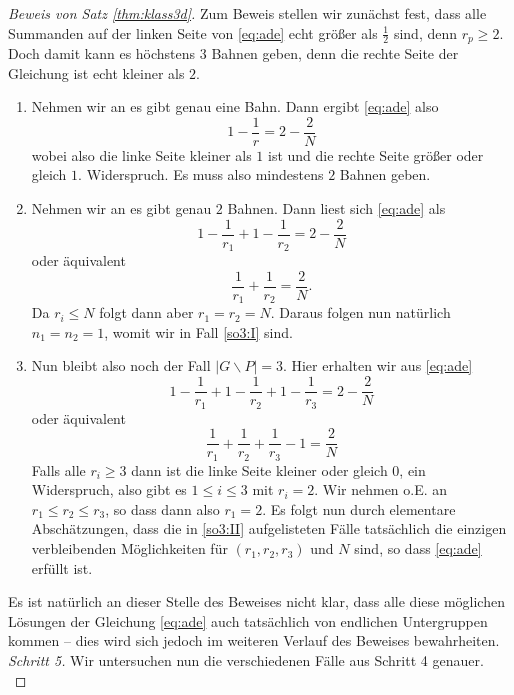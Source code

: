 \documentclass{book}
\begin{document}
\begin{proof}[Beweis von Satz \ref{thm:klass3d}]
    Zum Beweis stellen wir zunächst fest, dass alle Summanden auf der linken
    Seite von \eqref{eq:ade} echt größer als $\frac{1}{2}$ sind, denn $r_p \ge
    2$. Doch damit kann es höchstens $3$ Bahnen geben, denn die rechte Seite
    der Gleichung ist echt kleiner als $2$. 

    \begin{enumerate}
        \item Nehmen wir an es gibt genau eine Bahn. Dann ergibt \eqref{eq:ade} also
            \[
                1 - \frac{1}{r} = 2 - \frac{2}{N}  
            \]
            wobei also die linke Seite kleiner als $1$ ist und die rechte Seite größer oder gleich $1$. Widerspruch. Es muss also mindestens $2$ Bahnen geben.
        \item Nehmen wir an es gibt genau $2$ Bahnen. Dann liest sich \eqref{eq:ade} als
            \[
                1 - \frac{1}{r_1} +  1 - \frac{1}{r_2} = 2 - \frac{2}{N}  
            \]
            oder äquivalent
            \[
                \frac{1}{r_1} +\frac{1}{r_2} = \frac{2}{N}.  
            \]
            Da $r_i \le N$ folgt dann aber $r_1 = r_2 = N$. Daraus folgen nun natürlich $n_1 = n_2 = 1$, womit wir in Fall \ref{so3:I} sind.
        \item Nun bleibt also noch der Fall $|G \backslash P| = 3$. Hier erhalten wir aus \eqref{eq:ade}
            \[
                1 - \frac{1}{r_1} +  1 - \frac{1}{r_2} + 1 - \frac{1}{r_3} = 2 - \frac{2}{N}  
            \]
            oder äquivalent
            \[
                \frac{1}{r_1} + \frac{1}{r_2} + \frac{1}{r_3} - 1 = \frac{2}{N}
            \]
            Falls alle $r_i \ge 3$ dann ist die linke Seite kleiner oder gleich
            $0$, ein Widerspruch, also gibt es $1 \le i \le 3$ mit $r_i = 2$.
            Wir nehmen o.E. an $r_1 \le r_2 \le r_3$, so dass dann also $r_1 =
            2$. Es folgt nun durch elementare Abschätzungen, dass die in \ref{so3:II}
            aufgelisteten Fälle tatsächlich die einzigen verbleibenden
            Möglichkeiten für $(r_1,r_2,r_3)$ und $N$ sind, so dass
            \eqref{eq:ade} erfüllt ist.
    \end{enumerate}
    Es ist natürlich an dieser Stelle des Beweises nicht klar, dass alle diese
    möglichen Lösungen der Gleichung \eqref{eq:ade} auch tatsächlich von
    endlichen Untergruppen kommen -- dies wird sich jedoch im weiteren Verlauf
    des Beweises bewahrheiten.\\

    \noindent
    \emph{Schritt 5.} Wir untersuchen nun die verschiedenen Fälle aus Schritt 4
    genauer.\\


\end{proof}
\end{document}
